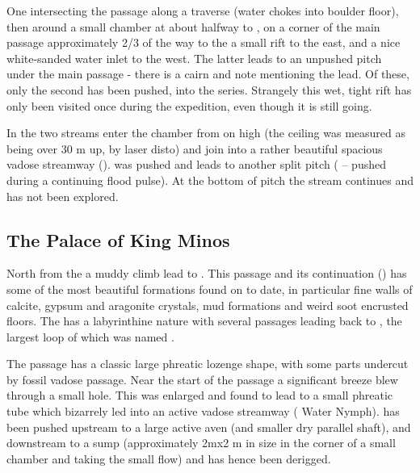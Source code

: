 One intersecting the passage along a traverse (water chokes into boulder floor), then around a small chamber at about halfway to , on a corner of the main passage approximately 2/3 of the way to
the  a small rift to the east, and a nice white-sanded water inlet to the west. The latter leads to an unpushed pitch under the main passage - there is a cairn and note mentioning the lead. Of these,
only the second has been pushed, into the  series. Strangely this wet, tight rift has only been visited once during the
expedition, even though it is still going.

In the  two streams enter the chamber from on high
(the ceiling was measured as being over 30 m up, by laser disto) and join into a rather beautiful spacious vadose streamway ().
 was pushed and leads to another split pitch ( -- pushed during a continuing flood pulse).
At the bottom of  pitch the stream continues and has not been explored.


\subsection{The Palace of King Minos}

North from the  a muddy climb lead to . This passage and its continuation () has some of the most beautiful formations found on  to date, in particular fine walls of calcite, gypsum and aragonite crystals, mud formations and weird soot encrusted floors. The  has a labyrinthine nature with several passages leading back to , the largest loop of which was named .

The passage has a classic large phreatic lozenge shape, with some parts undercut by fossil vadose passage. Near the start of the passage a
significant breeze blew through a small hole. This was enlarged and found to lead to a small phreatic tube which bizarrely led into an active vadose streamway ( \textemdash{} Water Nymph).  has been pushed upstream to a large active aven (and smaller dry parallel shaft), and downstream to a sump (approximately 2mx2 m in size in the corner of a small chamber and taking the small flow) and has hence been derigged.


